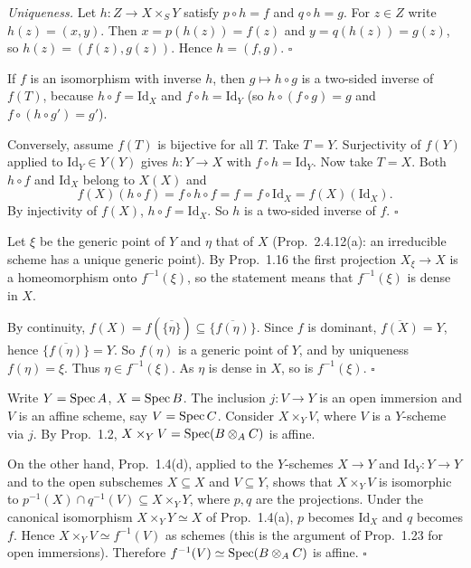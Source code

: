 \documentclass[11pt]{article}
\begin{document}
\emph{Uniqueness.} Let $h:Z\to X\times_S Y$ satisfy $p\circ h=f$ and $q\circ h=g$. For $z\in Z$ write $h(z)=(x,y)$. Then $x=p(h(z))=f(z)$ and $y=q(h(z))=g(z)$, so $h(z)=(f(z),g(z))$. Hence $h=(f,g)$. \hfill$\square$

\pf
If $f$ is an isomorphism with inverse $h$, then $g\mapsto h\circ g$ is a two-sided inverse of $f(T)$, because $h\circ f=\mathrm{Id}_X$ and $f\circ h=\mathrm{Id}_Y$ (so $h\circ(f\circ g)=g$ and $f\circ(h\circ g')=g'$).

Conversely, assume $f(T)$ is bijective for all $T$. Take $T=Y$. Surjectivity of $f(Y)$ applied to $\mathrm{Id}_Y\in Y(Y)$ gives $h:Y\to X$ with $f\circ h=\mathrm{Id}_Y$. Now take $T=X$. Both $h\circ f$ and $\mathrm{Id}_X$ belong to $X(X)$ and
\[ f(X)(h\circ f)=f\circ h\circ f=f=f\circ\mathrm{Id}_X=f(X)(\mathrm{Id}_X). \]
By injectivity of $f(X)$, $h\circ f=\mathrm{Id}_X$. So $h$ is a two-sided inverse of $f$. \hfill$\square$

\pf
Let $\xi$ be the generic point of $Y$ and $\eta$ that of $X$ (Prop.~2.4.12(a): an irreducible scheme has a unique generic point). By Prop.~1.16 the first projection $X_\xi\to X$ is a homeomorphism onto $f^{-1}(\xi)$, so the statement means that $f^{-1}(\xi)$ is dense in $X$.

By continuity, $f(X)=f(\overline{\{\eta\}})\subseteq\overline{\{f(\eta)\}}$. Since $f$ is dominant, $\overline{f(X)}=Y$, hence $\overline{\{f(\eta)\}}=Y$. So $f(\eta)$ is a generic point of $Y$, and by uniqueness $f(\eta)=\xi$. Thus $\eta\in f^{-1}(\xi)$. As $\eta$ is dense in $X$, so is $f^{-1}(\xi)$. \hfill$\square$

\pf
Write $Y=\operatorname{Spec} A$, $X=\operatorname{Spec} B$. The inclusion $j:V\to Y$ is an open immersion and $V$ is an affine scheme, say $V=\operatorname{Spec} C$. Consider $X\times_Y V$, where $V$ is a $Y$-scheme via $j$. By Prop.~1.2, $X\times_Y V=\operatorname{Spec}(B\otimes_A C)$ is affine.

On the other hand, Prop.~1.4(d), applied to the $Y$-schemes $X\to Y$ and $\mathrm{Id}_Y:Y\to Y$ and to the open subschemes $X\subseteq X$ and $V\subseteq Y$, shows that $X\times_Y V$ is isomorphic to $p^{-1}(X)\cap q^{-1}(V)\subseteq X\times_Y Y$, where $p,q$ are the projections. Under the canonical isomorphism $X\times_Y Y\simeq X$ of Prop.~1.4(a), $p$ becomes $\mathrm{Id}_X$ and $q$ becomes $f$. Hence $X\times_Y V\simeq f^{-1}(V)$ as schemes (this is the argument of Prop.~1.23 for open immersions). Therefore $f^{-1}(V)\simeq\operatorname{Spec}(B\otimes_A C)$ is affine. \hfill$\square$
\end{document}
